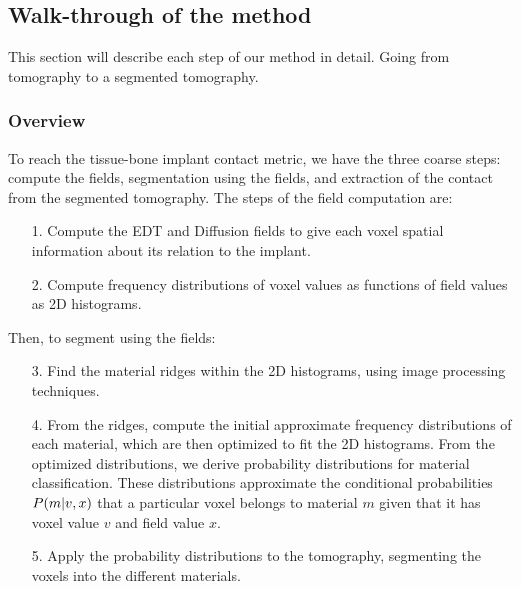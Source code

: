 
\subsection{Walk-through of the method}
This section will describe each step of our method in detail. Going from
tomography to a segmented tomography.

\subsubsection{Overview}
To reach the tissue-bone implant contact metric, we have the three coarse
steps: compute the fields, segmentation using the fields, and extraction of the
contact from the segmented tomography.
%
The steps of the field computation are:
\begin{enumerate}
    \item[1.] Compute the EDT and Diffusion fields to give each voxel spatial
        information about its relation to the implant.

    \item[2.] Compute frequency distributions of voxel values as functions of
        field values as 2D histograms.
\end{enumerate}
%
Then, to segment using the fields:
\begin{enumerate}
    \item[3.] Find the material ridges within the 2D histograms, using image
        processing techniques.

    \item[4.] From the ridges, compute the initial approximate frequency
        distributions of each material, which are then optimized to fit the 2D
        histograms. From the optimized distributions, we derive probability
        distributions for material classification. These distributions
        approximate the conditional probabilities $P\!\left(m\middle\vert v,x\right)$ that a
        particular voxel belongs to material $m$ given that it has voxel value
        $v$ and field value $x$.

    \item[5.] Apply the probability distributions to the tomography, segmenting
        the voxels into the different materials.
\end{enumerate}
